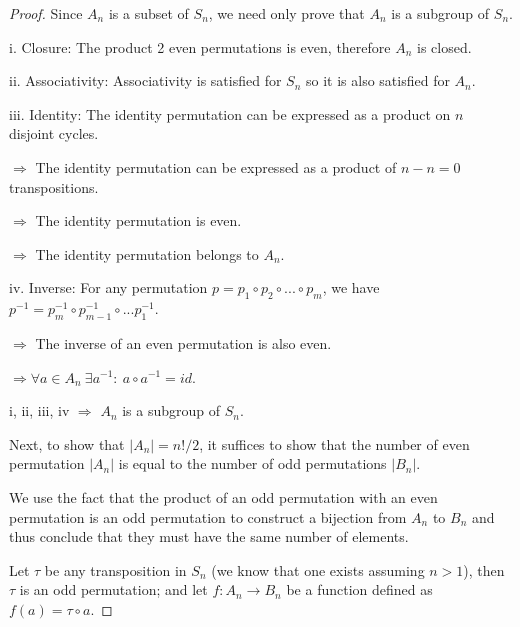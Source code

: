 \documentclass{article}
\begin{document}
\begin{proof}
  Since $A_n$ is a subset of $S_n$, we need only prove that $A_n$ is a subgroup of $S_n$.
  \newline

  \noindent
  i. Closure: The product 2 even permutations is even, therefore $A_n$ is closed.
  \newline

  \noindent
  ii. Associativity: Associativity is satisfied for $S_n$ so it is also satisfied for $A_n$.
  \newline

  \noindent
  iii. Identity: The identity permutation can be expressed as a product on $n$ disjoint cycles.
  
  \noindent
  $\Rightarrow$ The identity permutation can be expressed as a product of $n-n=0$ transpositions.
  
  \noindent
  $\Rightarrow$ The identity permutation is even.
  
  \noindent
  $\Rightarrow$ The identity permutation belongs to $A_n$.
  \newline

  \noindent
  iv. Inverse: For any permutation $p = p_1 \circ p_2 \circ ... \circ p_m$, we have $p^{-1} = p_m^{-1} \circ p_{m-1}^{-1} \circ ... p_1^{-1}$.

  \noindent
  $\Rightarrow$ The inverse of an even permutation is also even.

  \noindent
  $\Rightarrow \forall a \in A_n \ \exists a^{-1}: \ a \circ a^{-1} = id$.
  \newline

  \noindent
  i, ii, iii, iv $\Rightarrow$ $A_n$ is a subgroup of $S_n$.
  \newline

  \noindent
  Next, to show that $|A_n|=n!/2$, it suffices to show that the number of even permutation $|A_n|$ is equal to the number of odd permutations $|B_n|$.
  \newline

  \noindent
  We use the fact that the product of an odd permutation with an even permutation is an odd permutation to construct a bijection from $A_n$ to $B_n$ and thus conclude that they must have the same number of elements.
  \newline

  \noindent
  Let $\tau$ be any transposition in $S_n$ (we know that one exists assuming $n > 1$), then $\tau$ is an odd permutation; and let $f: A_n \rightarrow B_n$ be a function defined as $f(a) = \tau \circ a$.
  \newline


\end{proof}
\end{document}
